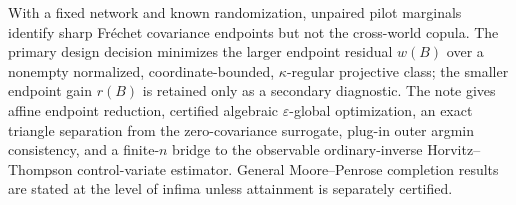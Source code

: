 With a fixed network and known randomization, unpaired pilot marginals identify sharp Fr\'echet covariance endpoints but not the cross-world copula.  The primary design decision minimizes the larger endpoint residual \(w(B)\) over a nonempty normalized, coordinate-bounded, \(\kappa\)-regular projective class; the smaller endpoint gain \(r(B)\) is retained only as a secondary diagnostic.  The note gives affine endpoint reduction, certified algebraic \(\varepsilon\)-global optimization, an exact triangle separation from the zero-covariance surrogate, plug-in outer argmin consistency, and a finite-\(n\) bridge to the observable ordinary-inverse Horvitz--Thompson control-variate estimator.  General Moore--Penrose completion results are stated at the level of infima unless attainment is separately certified.